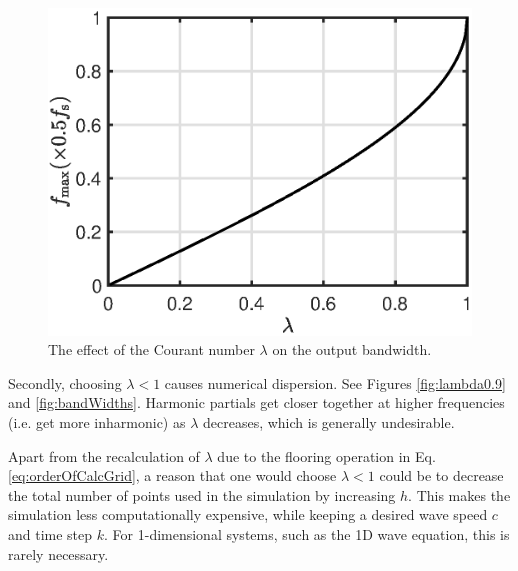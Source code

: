 \documentclass[dvipsnames, preprint]{JASA}
\begin{document}
\begin{figure}
\includegraphics[width=\reprintcolumnwidth]{bandwidthPlot}
\caption{\label{fig:bandWidthFormula}{The effect of the Courant number $\lambda$ on the output bandwidth.}}
\end{figure} 

Secondly, choosing $\lambda < 1$ causes numerical dispersion. See Figures \ref{fig:lambda0.9} and \ref{fig:bandWidths}. Harmonic partials get closer together at higher frequencies (i.e. get more inharmonic) as $\lambda$ decreases, which is generally undesirable.

Apart from the recalculation of $\lambda$ due to the flooring operation in Eq. \eqref{eq:orderOfCalcGrid}, a reason that one would choose $\lambda < 1$ could be to decrease the total number of points used in the simulation by increasing $h$. This makes the simulation less computationally expensive, while keeping a desired wave speed $c$ and time step $k$. For 1-dimensional systems, such as the 1D wave equation, this is rarely necessary.
\end{document}
